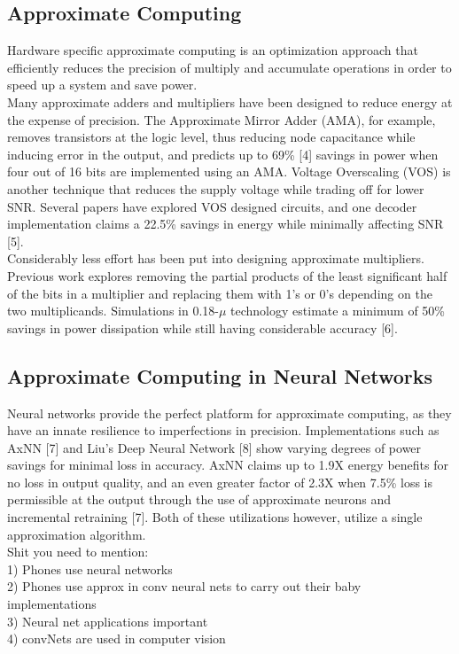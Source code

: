 \documentclass[conference]{IEEEtran}
\begin{document}
\subsection{Approximate Computing}
	Hardware specific approximate computing is an optimization approach that efficiently reduces the precision of multiply and accumulate operations in order to speed up a system and save power. \\
	\indent Many approximate adders and multipliers have been designed to reduce energy at the expense of precision. The Approximate Mirror Adder (AMA), for example, removes transistors at the logic level, thus reducing node capacitance while inducing error in the output, and predicts up to 69\% [4] savings in power when four out of 16 bits are implemented using an AMA. Voltage Overscaling (VOS) is another technique that reduces the supply voltage while trading off for lower SNR. Several papers have explored VOS designed circuits, and one decoder implementation claims a 22.5\% savings in energy while minimally affecting SNR [5]. \\
	\indent Considerably less effort has been put into designing approximate multipliers. Previous work explores removing the partial products of the least significant half of the bits in a multiplier and replacing them with 1's or 0's depending on the two multiplicands. Simulations in 0.18-$\mu$ technology estimate a minimum of 50\% savings in power dissipation while still having considerable accuracy [6].

\subsection{Approximate Computing in Neural Networks}
	Neural networks provide the perfect platform for approximate computing, as they have an innate resilience to imperfections in precision. Implementations such as AxNN [7] and Liu's Deep Neural Network [8] show varying degrees of power savings for minimal loss in accuracy. AxNN claims up to 1.9X energy benefits for no loss in output quality, and an even greater factor of 2.3X when 7.5\% loss is permissible at the output through the use of approximate neurons and incremental retraining [7]. Both of these utilizations however, utilize a single approximation algorithm. \\
	
	Shit you need to mention:\\
		1) Phones use neural networks \\
		2) Phones use approx in conv neural nets to carry out their baby implementations\\
		3) Neural net applications important \\
		4) convNets are used in computer vision\\
		
\end{document}
